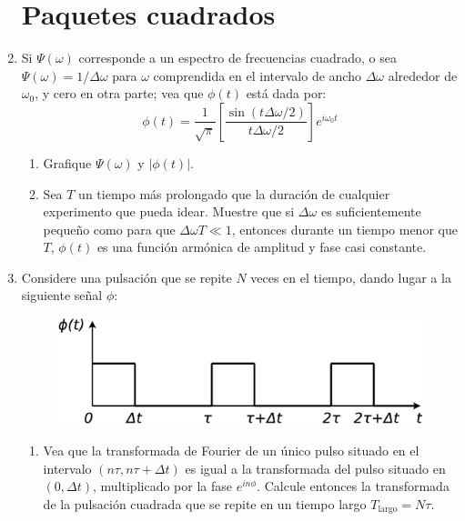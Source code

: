 \documentclass[11pt,spanish]{article}
\begin{document}
\begin{enumerate}
\section*{Paquetes cuadrados}


    \item Si $\Psi(\omega)$ corresponde a un espectro de frecuencias cuadrado,
    o sea $\Psi(\omega)=1/\Delta\omega$ para $\omega$ comprendida en
    el intervalo de ancho $\Delta\omega$ alrededor de $\omega_{0}$,
    y cero en otra parte; vea que $\phi(t)$ está dada por: 
    \[
    \phi(t)=\frac{1}{\sqrt{\pi}}\left[\frac{\sin(t\Delta\omega/2)}{t\Delta\omega/2}\right]e^{i\omega_{0}t}
    \]

    \begin{enumerate}
        \item Grafique $\Psi(\omega)$ y $\left|\phi(t)\right|$.

        \item Sea $T$ un tiempo más prolongado que la duración de cualquier
        experimento que pueda idear. Muestre que si $\Delta\omega$ es
        suficientemente pequeño como para que $\Delta\omega T\ll1$, entonces
        durante un tiempo menor que $T$, $\phi(t)$ es una función armónica de
        amplitud y fase casi constante.
    \end{enumerate}


    \item Considere una pulsación que se repite $N$ veces en el tiempo, dando
    lugar a la siguiente señal $\phi$:

    \begin{figure}[H]
        \centering{}\includegraphics[clip,scale=0.25]{figs/ej2-18}
    \end{figure}

    \begin{enumerate}
        
        \item Vea que la transformada de Fourier de un único pulso situado en el
        intervalo $(n\tau,n\tau+\Delta t)$ es igual a la transformada del pulso
        situado en $(0,\Delta t)$, multiplicado por la fase $e^{in\phi}$.
        Calcule entonces la transformada de la pulsación cuadrada que se repite
        en un tiempo largo $T_\text{largo}=N\tau$.


\end{enumerate}
\end{enumerate}
\end{document}

